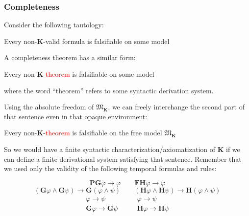 \documentclass[xcolor=x11names]{beamer}
\newcommand{\cemph}[1]{\textcolor{red}{#1}}
\newcommand{\FD}{\mathbf F}
\newcommand{\FB}{\mathbf G}
\newcommand{\PD}{\mathbf P}
\newcommand{\PB}{\mathbf H}
\newcommand{\lrule}[3][c]{\begin{array}{#1} #2  \\  \hline #3 \end{array}}
\newcommand{\lthen}{\rightarrow}
\begin{document}
\begin{frame}[t]
\frametitle{Completeness}
Consider the following tautology:

\begin{center}Every non-$\mathbf K$-valid formula is falsifiable on some model\end{center}

A completeness theorem has a similar form:

\begin{center}Every non-$\mathbf K$-\cemph{theorem} is falsifiable on some model\end{center}
where the word ``theorem'' refers to some syntactic derivation system.

Using the absolute freedom of $\mathfrak M_{\mathbf K}$, we can freely interchange the second part of that sentence even in that opaque environment:

\begin{center}Every non-$\mathbf K$-\cemph{theorem} is falsifiable on the free model $\mathfrak M_{\mathbf K}$\end{center}

So we would have a finite syntactic characterization/axiomatization of $\mathbf K$ if we can define a finite derivational system satisfying that sentence.
Remember that we used only the validity of the following temporal formulas and rules:

\[ \PD\FB\varphi \lthen \varphi\qquad \FD\PB\varphi \lthen \varphi \]
\[ (\FB\varphi \land \FB \psi )\lthen \FB(\varphi \land \psi ) \qquad (\PB\varphi \land \PB \psi )\lthen \PB(\varphi \land \psi ) \]
\[ \lrule{\varphi \lthen \psi }{\FB\varphi \lthen \FB\psi } \qquad \lrule{\varphi \lthen \psi }{\PB\varphi \lthen \PB\psi } \]

\end{frame}

\end{document}
